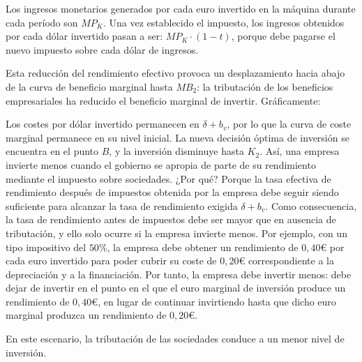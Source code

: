 \documentclass[10pt,a4paper]{article}
\begin{document}
Los ingresos monetarios generados por cada euro invertido en la máquina durante cada período son $MP_K$. Una vez establecido el impuesto, los ingresos obtenidos por cada dólar invertido pasan a ser: $MP_K \cdot (1 − t)$, porque debe pagarse el nuevo impuesto sobre cada dólar de ingresos.

Esta reducción del rendimiento efectivo provoca un desplazamiento hacia abajo de la curva de beneficio marginal hasta $MB_2$: la tributación de los beneficios empresariales ha reducido el beneficio marginal de invertir. Gráficamente:


Los costes por dólar invertido permanecen en $\delta + b_v$, por lo que la curva de coste marginal permanece en su nivel inicial. La nueva decisión óptima de inversión se encuentra en el punto $B$, y la inversión disminuye hasta $K_2$. Así, una empresa invierte menos cuando el gobierno se apropia de parte de su rendimiento mediante el impuesto sobre sociedades. ¿Por qué? Porque la tasa efectiva de rendimiento después de impuestos obtenida por la empresa debe seguir siendo suficiente para alcanzar la tasa de rendimiento exigida $\delta + b_v$. Como consecuencia, la tasa de rendimiento antes de impuestos debe ser mayor que en ausencia de tributación, y ello solo ocurre si la empresa invierte menos. Por ejemplo, con un tipo impositivo del $50\%$, la empresa debe obtener un rendimiento de $0,40€$ por cada euro invertido para poder cubrir su coste de $0,20$€ correspondiente a la depreciación y a la financiación. Por tanto, la empresa debe invertir menos: debe dejar de invertir en el punto en el que el euro marginal de inversión produce un rendimiento de $0,40€$, en lugar de continuar invirtiendo hasta que dicho euro marginal produzca un rendimiento de $0,20€$. 

En este escenario, la tributación de las sociedades conduce a un menor nivel de inversión.
\end{document}
